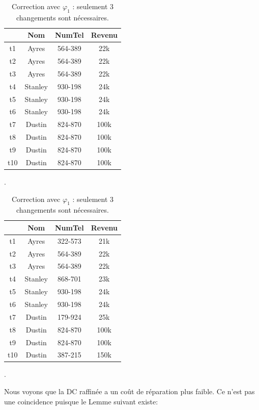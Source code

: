\documentclass[letterpaper, 12pt]{report}
\theoremstyle{definition}
\begin{document}
\begin{table}[H]
	\parbox{.45\linewidth}{
	\centering
	\begin{tabular}{|c|c c c|}
	\hline
	    & Nom & NumTel & Revenu\\
	\hline
	 t1 & Ayres & \color{red}564-389 & \color{red}22k\\
	 t2 & Ayres & \color{red}564-389 & 22k\\
	 t3 & Ayres & 564-389 & 22k\\
	 t4 & Stanley &\color{red} 930-198 &\color{red}24k\\
	 t5 & Stanley &\color{red} 930-198 & 24k\\
	 t6 & Stanley & 930-198 & 24k\\
	 t7 & Dustin & \color{red}824-870 & \color{red}100k\\
	 t8 & Dustin & \color{red}824-870 & 100k\\
	 t9 & Dustin & 824-870 & 100k\\
	 t10 & Dustin & \color{red}824-870 & \color{red}100k\\
	 \hline
	\end{tabular}
	\caption{Correction avec $\varphi_2$: 7 changement nécessaire dans la colonne $NumTel$}.
	}
	\hfill
	\parbox{.45\linewidth}{
	\centering
	\begin{tabular}{|c|c c c|}
	\hline
	    & Nom & NumTel & Revenu\\
	\hline
	 t1 & Ayres & 322-573 & 21k\\
	 t2 & Ayres & \color{red} 564-389 & 22k\\
	 t3 & Ayres & 564-389 & 22k\\
	 t4 & Stanley & 868-701 &23k\\
	 t5 & Stanley & \color{red} 930-198 & 24k\\
	 t6 & Stanley & 930-198 & 24k\\
	 t7 & Dustin & 179-924 & 25k\\
	 t8 & Dustin & \color{red} 824-870 & 100k\\
	 t9 & Dustin & 824-870 & 100k\\
	 t10 & Dustin & 387-215 & 150k\\
	 \hline
	\end{tabular}
	\caption{Correction avec $\varphi_1$ : seulement 3 changements sont nécessaires.}.
	}
\end{table}



Nous voyons que la DC raffinée a un coût de réparation plus faible. Ce n'est pas une coincidence puisque le Lemme suivant existe: \cite{main}
\end{document}
